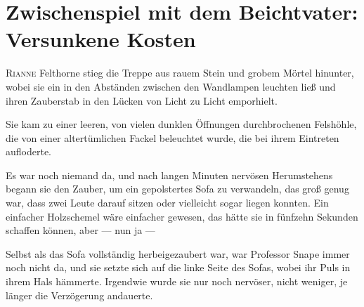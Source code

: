 \chapter{Zwischenspiel mit dem Beichtvater: Versunkene Kosten}

\lettrine{R}{ianne} Felthorne stieg die Treppe aus rauem Stein und grobem Mörtel hinunter, wobei sie ein  in den Abständen zwischen den Wandlampen leuchten ließ und ihren Zauberstab in den Lücken von Licht zu Licht emporhielt.

Sie kam zu einer leeren, von vielen dunklen Öffnungen durchbrochenen Felshöhle, die von einer altertümlichen Fackel beleuchtet wurde, die bei ihrem Eintreten aufloderte.

Es war noch niemand da, und nach langen Minuten nervösen Herumstehens begann sie den Zauber, um ein gepolstertes Sofa zu verwandeln, das groß genug war, dass zwei Leute darauf sitzen oder vielleicht sogar liegen konnten. Ein einfacher Holzschemel wäre einfacher gewesen, das hätte sie in fünfzehn Sekunden schaffen können, aber — nun ja —

Selbst als das Sofa vollständig herbeigezaubert war, war Professor Snape immer noch nicht da, und sie setzte sich auf die linke Seite des Sofas, wobei ihr Puls in ihrem Hals hämmerte. Irgendwie wurde sie nur noch nervöser, nicht weniger, je länger die Verzögerung andauerte.


